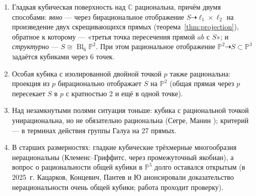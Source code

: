 \documentclass[11pt,a4paper]{article}
\theoremstyle{plain}
\theoremstyle{definition}
\theoremstyle{remark}
\renewcommand{\C}{\mathbb{C}}
\newcommand{\PP}{\mathbb{P}}
\DeclareMathOperator{\Bl}{Bl}
\begin{document}
\begin{enumerate}
\item Гладкая кубическая поверхность над $\C$ рациональна, причём двумя способами:
\emph{явно} --- через бирациональное отображение $S\dashrightarrow\ell_1\times\ell_2$ на произведение двух
скрещивающихся прямых (теорема~\ref{thm:projection}), обратное к которому --- «третья точка пересечения прямой
$ab$ с $S$»; и \emph{структурно} --- $S\cong\Bl_6\PP^2$. При этом рациональное отображение $\PP^2\dashrightarrow
S\subset\PP^3$ задаётся кубиками через 6 точек.
\item Особая кубика с изолированной двойной точкой $p$ также рациональна: проекция из $p$ бирационально отображает
$S$ на $\PP^2$ (общая прямая через $p$ пересекает $S$ в $p$ с кратностью 2 и ещё в одной точке).
\item Над незамкнутыми полями ситуация тоньше: кубика с рациональной точкой унирациональна, но не обязательно
рациональна (Сегре, Манин \cite{Ma}); критерий --- в терминах действия группы Галуа на 27 прямых.
\item В старших размерностях: гладкие кубические трёхмерные многообразия нерациональны (Клеменс--Гриффитс, через
промежуточный якобиан), а вопрос о рациональности общей кубики в $\PP^5$ долго оставался открытым (в 2025~г. Кацарков, Концевич,
Пантев и Ю анонсировали доказательство нерациональности очень общей кубики; работа проходит проверку).
\end{enumerate}
\end{document}
